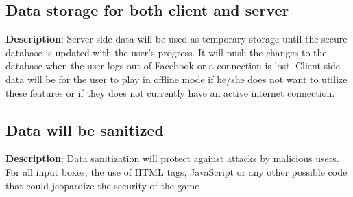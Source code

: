 \subsection{Data storage for both client and server}
\textbf{Description}: Server-side data will be used as temporary storage until
the secure database is updated with the user\textquoteright{}s progress.
It will push the changes to the database when the user logs out of
Facebook or a connection is lost. Client-side data will be for the
user to play in offline mode if he/she does not want to utilize these
features or if they does not currently have an active internet connection.

\subsection{Data will be sanitized}
\textbf{Description}: Data sanitization will protect against attacks by malicious
users. For all input boxes, the use of HTML tags, JavaScript or any
other possible code that could jeopardize the security of the game
